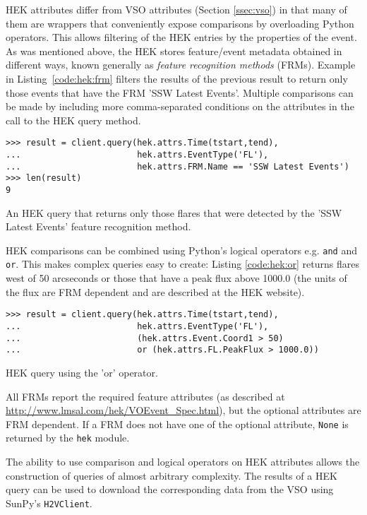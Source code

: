 HEK attributes differ from VSO attributes (Section \ref{ssec:vso}) in that many 
of them are wrappers that conveniently expose comparisons by overloading Python 
operators. This allows filtering of the HEK entries by the properties of the 
event. As was mentioned above, the HEK stores feature/event metadata obtained 
in different ways, known generally as {\it feature recognition methods} (FRMs). 
Example in Listing~\ref{code:hek:frm} filters the results of the previous 
result to return only those events that have the FRM 'SSW Latest Events'.  Multiple comparisons can be made by including more comma-separated
conditions on the attributes in the call to the HEK query method.
\begin{listing}[H]
\begin{verbatim}
>>> result = client.query(hek.attrs.Time(tstart,tend), 
...                       hek.attrs.EventType('FL'),
...                       hek.attrs.FRM.Name == 'SSW Latest Events')
>>> len(result)
9
\end{verbatim}
\caption{An HEK query that returns only those flares that were
  detected by the 'SSW Latest Events' feature recognition method.}
\label{code:hek:frm}
\end{listing}

HEK comparisons can be combined using Python’s logical operators e.g. \texttt{and}
and \texttt{or}. This makes complex queries easy to create: Listing \ref{code:hek:or} 
returns flares west of 50 arcseconds or those that have a peak flux above 
1000.0 (the units of the flux are FRM dependent and are described at the HEK 
website).
\begin{listing}[H]
\begin{verbatim}
>>> result = client.query(hek.attrs.Time(tstart,tend), 
...                       hek.attrs.EventType('FL'),
...                       (hek.attrs.Event.Coord1 > 50) 
...                       or (hek.attrs.FL.PeakFlux > 1000.0))
\end{verbatim}
\caption{HEK query using the 'or' operator.}
\label{code:hek:or}
\end{listing}
All FRMs report the required feature attributes (as described at 
\url{http://www.lmsal.com/hek/VOEvent_Spec.html}), but the optional attributes 
are FRM dependent.  If a FRM does not have one of the optional attribute, 
\texttt{None} is returned by the \texttt{hek} module. 

The ability to use comparison and logical operators on HEK attributes allows 
the construction of queries of almost arbitrary complexity. 
The results of a HEK query can be used to download the 
corresponding data from the VSO using SunPy's \texttt{H2VClient}.
